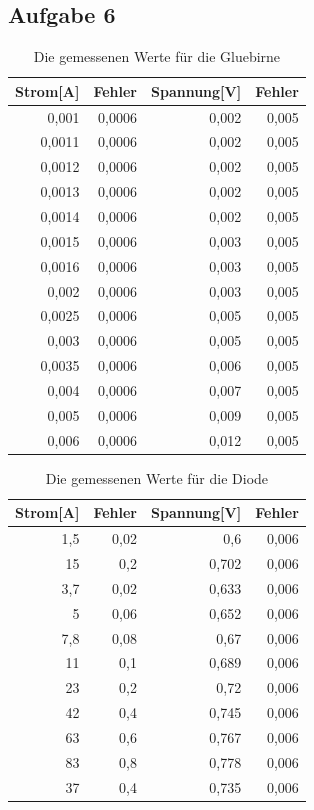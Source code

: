 \documentclass[12pt]{scrartcl}
\begin{document}
\newpage

\subsection{Aufgabe 6}
\begin{table}[htbp]
\caption{Die gemessenen Werte für die Gluebirne}
\begin{tabular}{|r|r|r|r|}
\hline
\multicolumn{1}{|l|}{Strom[A]} & \multicolumn{1}{l|}{Fehler} & \multicolumn{1}{l|}{Spannung[V]} & \multicolumn{1}{l|}{Fehler} \\ \hline
0,001 & 0,0006 & 0,002 & 0,005 \\ \hline
0,0011 & 0,0006 & 0,002 & 0,005 \\ \hline
0,0012 & 0,0006 & 0,002 & 0,005 \\ \hline
0,0013 & 0,0006 & 0,002 & 0,005 \\ \hline
0,0014 & 0,0006 & 0,002 & 0,005 \\ \hline
0,0015 & 0,0006 & 0,003 & 0,005 \\ \hline
0,0016 & 0,0006 & 0,003 & 0,005 \\ \hline
0,002 & 0,0006 & 0,003 & 0,005 \\ \hline
0,0025 & 0,0006 & 0,005 & 0,005 \\ \hline
0,003 & 0,0006 & 0,005 & 0,005 \\ \hline
0,0035 & 0,0006 & 0,006 & 0,005 \\ \hline
0,004 & 0,0006 & 0,007 & 0,005 \\ \hline
0,005 & 0,0006 & 0,009 & 0,005 \\ \hline
0,006 & 0,0006 & 0,012 & 0,005 \\ \hline
\end{tabular}
\label{aufgabe_6_gluebirne}
\end{table}

\begin{table}[htbp]
\caption{Die gemessenen Werte für die Diode}
\begin{tabular}{|r|r|r|r|}
\hline
\multicolumn{1}{|l|}{Strom[A]} & \multicolumn{1}{l|}{Fehler} & \multicolumn{1}{l|}{Spannung[V]} & \multicolumn{1}{l|}{Fehler} \\ \hline
1,5 & 0,02 & 0,6 & 0,006 \\ \hline
15 & 0,2 & 0,702 & 0,006 \\ \hline
3,7 & 0,02 & 0,633 & 0,006 \\ \hline
5 & 0,06 & 0,652 & 0,006 \\ \hline
7,8 & 0,08 & 0,67 & 0,006 \\ \hline
11 & 0,1 & 0,689 & 0,006 \\ \hline
23 & 0,2 & 0,72 & 0,006 \\ \hline
42 & 0,4 & 0,745 & 0,006 \\ \hline
63 & 0,6 & 0,767 & 0,006 \\ \hline
83 & 0,8 & 0,778 & 0,006 \\ \hline
37 & 0,4 & 0,735 & 0,006 \\ \hline
\end{tabular}
\label{aufgabe_6_diode}
\end{table}
\end{document}
